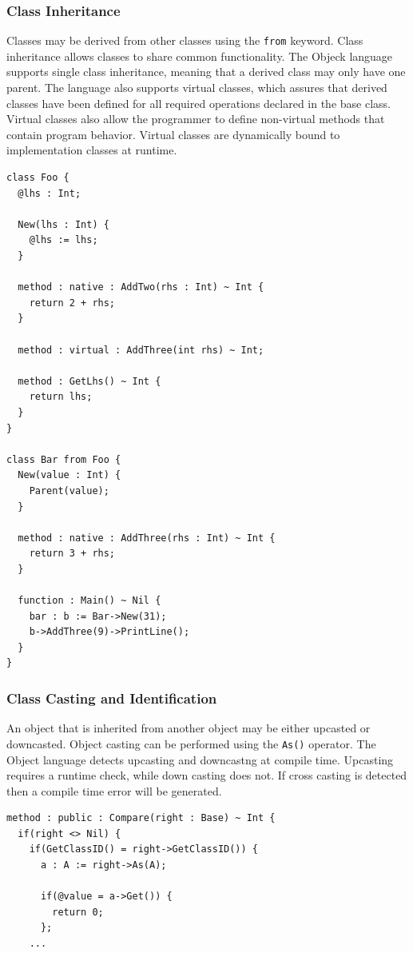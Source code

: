\documentclass[12pt]{article}
\begin{document}
\subsubsection{Class Inheritance}
Classes may be derived from other classes using the \texttt{from} keyword.  Class inheritance allows classes to share common functionality.  The Objeck language supports single class inheritance, meaning that a derived class may only have one parent.  The language also supports virtual classes, which assures that derived classes have been defined for all required operations declared in the base class.  Virtual classes also allow the programmer to define non-virtual methods that contain program behavior.  Virtual classes are dynamically bound to implementation classes at runtime.
\begin{verbatim}
class Foo {
  @lhs : Int;

  New(lhs : Int) {
    @lhs := lhs;
  }

  method : native : AddTwo(rhs : Int) ~ Int {
    return 2 + rhs;
  }

  method : virtual : AddThree(int rhs) ~ Int;

  method : GetLhs() ~ Int {
    return lhs;
  }
}

class Bar from Foo {
  New(value : Int) {
    Parent(value);
  }

  method : native : AddThree(rhs : Int) ~ Int {
    return 3 + rhs;
  }

  function : Main() ~ Nil {
    bar : b := Bar->New(31);
    b->AddThree(9)->PrintLine();
  }
}
\end{verbatim}

\subsubsection{Class Casting and Identification}
An object that is inherited from another object may be either upcasted or downcasted.  Object casting can be performed using the \texttt{As()} operator.  The Object language detects upcasting and downcastng at compile time. Upcasting requires a runtime check, while down casting does not. If cross casting is detected then a compile time error will be generated.

\begin{verbatim}
method : public : Compare(right : Base) ~ Int {
  if(right <> Nil) {
    if(GetClassID() = right->GetClassID()) {
      a : A := right->As(A);

      if(@value = a->Get()) {
        return 0;
      };
    ...	
\end{verbatim}
\end{document}
